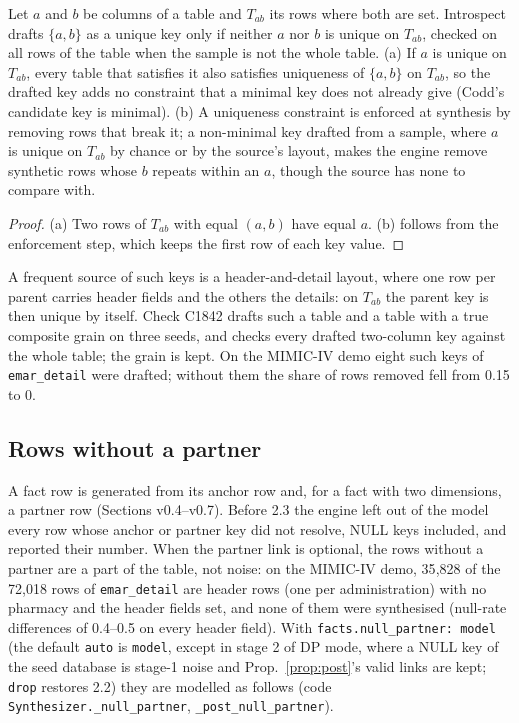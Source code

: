\setcounter{proposition}{1841}
\begin{proposition}\label{prop:minimalkey}
Let $a$ and $b$ be columns of a table and $T_{ab}$ its rows where both are set. Introspect drafts $\{a,b\}$ as a unique key only if neither $a$ nor $b$ is unique on $T_{ab}$, checked on all rows of the table when the sample is not the whole table. (a) If $a$ is unique on $T_{ab}$, every table that satisfies it also satisfies uniqueness of $\{a,b\}$ on $T_{ab}$, so the drafted key adds no constraint that a minimal key does not already give (Codd's candidate key is minimal). (b) A uniqueness constraint is enforced at synthesis by removing rows that break it; a non-minimal key drafted from a sample, where $a$ is unique on $T_{ab}$ by chance or by the source's layout, makes the engine remove synthetic rows whose $b$ repeats within an $a$, though the source has none to compare with.
\end{proposition}
\begin{proof}
(a) Two rows of $T_{ab}$ with equal $(a,b)$ have equal $a$. (b) follows from the enforcement step, which keeps the first row of each key value.
\end{proof}
\noindent A frequent source of such keys is a header-and-detail layout, where one row per parent carries header fields and the others the details: on $T_{ab}$ the parent key is then unique by itself. Check C1842 drafts such a table and a table with a true composite grain on three seeds, and checks every drafted two-column key against the whole table; the grain is kept. On the MIMIC-IV demo eight such keys of \texttt{emar\_detail} were drafted; without them the share of rows removed fell from 0.15 to 0.

\subsection*{Rows without a partner}
A fact row is generated from its anchor row and, for a fact with two dimensions, a partner row (Sections v0.4--v0.7). Before 2.3 the engine left out of the model every row whose anchor or partner key did not resolve, NULL keys included, and reported their number. When the partner link is optional, the rows without a partner are a part of the table, not noise: on the MIMIC-IV demo, 35{,}828 of the 72{,}018 rows of \texttt{emar\_detail} are header rows (one per administration) with no pharmacy and the header fields set, and none of them were synthesised (null-rate differences of 0.4--0.5 on every header field). With \texttt{facts.null\_partner: model} (the default \texttt{auto} is \texttt{model}, except in stage 2 of DP mode, where a NULL key of the seed database is stage-1 noise and Prop.~\ref{prop:post}'s valid links are kept; \texttt{drop} restores 2.2) they are modelled as follows (code \texttt{Synthesizer.\_null\_partner}, \texttt{\_post\_null\_partner}).

